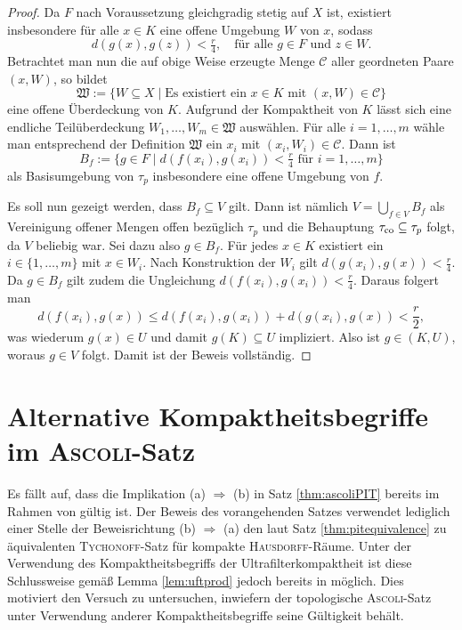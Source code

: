 \begin{proof}
  Da $F$ nach Voraussetzung gleichgradig stetig auf $X$ ist, existiert insbesondere für alle $x \in K$ eine offene Umgebung $W$ von $x$, sodass 
  \begin{displaymath}
    d(g(x),g(z)) < \tfrac{r}{4}, \quad \text{für alle $g \in F$ und $z \in W$}.
  \end{displaymath}
  Betrachtet man nun die auf obige Weise erzeugte Menge $\mathcal{C}$ aller geordneten Paare $(x,W)$, so bildet
  \begin{displaymath}
    \mathfrak{W} := \{W \subseteq X \mid \text{Es existiert ein $x \in K$ mit $(x,W) \in \mathcal{C}$} \}
  \end{displaymath}
  eine offene Überdeckung von $K$.
  Aufgrund der Kompaktheit von $K$ lässt sich eine endliche Teilüberdeckung $W_1,\dots,W_m \in \mathfrak{W}$ auswählen.
  Für alle $i = 1,\dots,m$ wähle man entsprechend der Definition $\mathfrak{W}$ ein $x_i$ mit $(x_i,W_i) \in \mathcal{C}$.
  Dann ist
  \begin{displaymath}
    B_f := \{ g \in F \mid d(f(x_i),g(x_i)) < \tfrac{r}{4} \text{ für } i = 1,\dots,m\}
  \end{displaymath}
  als Basisumgebung von $\tau_p$ insbesondere eine offene Umgebung von $f$.

  Es soll nun gezeigt werden, dass $B_f \subseteq V$ gilt.
  Dann ist nämlich $V = \bigcup_{f \in V} B_f$ als Vereinigung offener Mengen offen bezüglich $\tau_p$ und die Behauptung $\tau_{\mathrm{co}} \subseteq \tau_p$ folgt, da $V$ beliebig war.
  Sei dazu also $g \in B_f$.
  Für jedes $x \in K$ existiert ein $i \in \{1,\dots,m\}$ mit $x \in W_i$.
  Nach Konstruktion der $W_i$ gilt $d(g(x_i),g(x)) < \tfrac{r}{4}$.
  Da $g \in B_f$ gilt zudem die Ungleichung $d(f(x_i),g(x_i)) < \tfrac{r}{4}$.
  Daraus folgert man
  \begin{displaymath}
    d(f(x_i),g(x)) \leq d(f(x_i),g(x_i)) + d(g(x_i),g(x)) < \frac{r}{2},
  \end{displaymath}
  was wiederum $g(x) \in U$ und damit $g(K) \subseteq U$ impliziert. 
  Also ist $g \in (K,U)$, woraus $g \in V$ folgt.
  Damit ist der Beweis vollständig.
\end{proof}

\section{Alternative Kompaktheitsbegriffe im \textsc{Ascoli}-Satz}

Es fällt auf, dass die Implikation (a) $\Rightarrow$ (b) in Satz \ref{thm:ascoliPIT} bereits im Rahmen von \ZF gültig ist.
Der Beweis des vorangehenden Satzes verwendet lediglich einer Stelle der Beweisrichtung (b) $\Rightarrow$ (a) den laut Satz \ref{thm:pitequivalence} zu \PIT äquivalenten \textsc{Tychonoff}-Satz für kompakte \textsc{Hausdorff}-Räume.
Unter der Verwendung des Kompaktheitsbegriffs der Ultrafilterkompaktheit ist diese Schlussweise gemäß Lemma \ref{lem:uftprod} jedoch bereits in \ZF möglich.  
Dies motiviert den Versuch zu untersuchen, inwiefern der topologische \textsc{Ascoli}-Satz unter Verwendung anderer Kompaktheitsbegriffe seine Gültigkeit behält.

